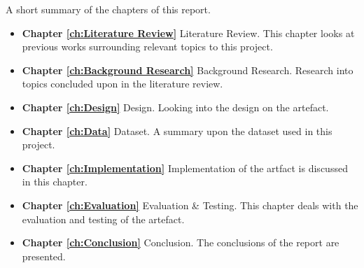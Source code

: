 A short summary of the chapters of this report.
\begin{itemize}
	\item \textbf{Chapter \ref{ch:Literature Review}} Literature Review. This chapter looks at previous works surrounding relevant topics to this project.
	\item \textbf{Chapter \ref{ch:Background Research}} Background Research. Research into topics concluded upon in the literature review.
	\item \textbf{Chapter \ref{ch:Design}} Design. Looking into the design on the artefact.
	\item \textbf{Chapter \ref{ch:Data}} Dataset. A summary upon the dataset used in this project. 
	\item \textbf{Chapter \ref{ch:Implementation}} Implementation of the artfact is discussed in this chapter.
	\item \textbf{Chapter \ref{ch:Evaluation}} Evaluation \& Testing. This chapter deals with the evaluation and testing of the artefact.
	\item \textbf{Chapter \ref{ch:Conclusion}} Conclusion. The conclusions of the report are presented.
\end{itemize}

